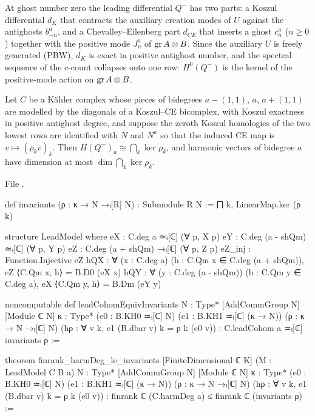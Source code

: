 At ghost number zero the leading differential $Q^-$ has two parts: a Koszul differential $d_K$ that contracts the auxiliary creation modes of
$U$ against the antighosts $b^a_{-n}$, and a Chevalley--Eilenberg part $d_{CE}$ that inserts a ghost $c^a_n$ ($n\ge0$) together with the
positive mode $J^a_n$ of $\operatorname{gr} A\otimes B$. Since the auxiliary $U$ is freely generated (PBW), $d_K$ is exact in positive antighost
number, and the spectral sequence of the $c$-count collapses onto one row: $H^0(Q^-)$ is the kernel of the positive-mode action on
$\operatorname{gr} A\otimes B$.

\begin{theorem}\label{l28:thm:koszul}
Let $C$ be a Kähler complex whose pieces of bidegrees $a-(1,1)$, $a$, $a+(1,1)$ are modelled by the diagonals of a Koszul--CE bicomplex, with
Koszul exactness in positive antighost degree, and suppose the zeroth Koszul homologies of the two lowest rows are identified with $N$ and
$N^\kappa$ so that the induced CE map is $v\mapsto(\rho_kv)_k$. Then $H(Q^-)_a\cong\bigcap_k\ker\rho_k$, and harmonic vectors of bidegree $a$ have
dimension at most $\dim\bigcap_k\ker\rho_k$.
\end{theorem}

\noindent File .
\begin{leancode}
def invariants (ρ : κ → N →ₗ[R] N) : Submodule R N := ⨅ k, LinearMap.ker (ρ k)

structure LeadModel where
  eX : C.deg a ≃ₗ[ℂ] (∀ p, X p)
  eY : C.deg (a - shQm) ≃ₗ[ℂ] (∀ p, Y p)
  eZ : C.deg (a + shQm) →ₗ[ℂ] (∀ p, Z p)
  eZ_inj : Function.Injective eZ
  hQX : ∀ (x : C.deg a) (h : C.Qm x ∈ C.deg (a + shQm)), eZ ⟨C.Qm x, h⟩ = B.D0 (eX x)
  hQY : ∀ (y : C.deg (a - shQm)) (h : C.Qm y ∈ C.deg a), eX ⟨C.Qm y, h⟩ = B.Dm (eY y)

noncomputable def leadCohomEquivInvariants {N : Type*} [AddCommGroup N] [Module ℂ N]
    {κ : Type*}
    (e0 : B.KH0 ≃ₗ[ℂ] N) (e1 : B.KH1 ≃ₗ[ℂ] (κ → N)) (ρ : κ → N →ₗ[ℂ] N)
    (hρ : ∀ v k, e1 (B.dbar v) k = ρ k (e0 v)) : C.leadCohom a ≃ₗ[ℂ] invariants ρ :=

theorem finrank_harmDeg_le_invariants [FiniteDimensional ℂ K] (M : LeadModel C B a)
    {N : Type*} [AddCommGroup N] [Module ℂ N] {κ : Type*}
    (e0 : B.KH0 ≃ₗ[ℂ] N) (e1 : B.KH1 ≃ₗ[ℂ] (κ → N)) (ρ : κ → N →ₗ[ℂ] N)
    (hρ : ∀ v k, e1 (B.dbar v) k = ρ k (e0 v)) :
    finrank ℂ (C.harmDeg a) ≤ finrank ℂ (invariants ρ) :=
\end{leancode}

